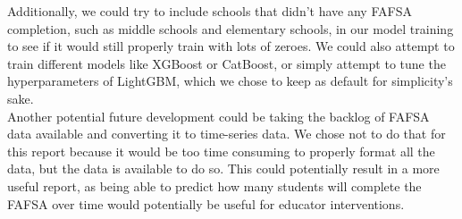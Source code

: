 \documentclass[12pt]{article}
\begin{document}
Additionally, we could try to include schools that didn't have any FAFSA completion, 
such as middle schools and elementary schools, in our model training to see if it would
still properly train with lots of zeroes. We could also attempt to train different models
like XGBoost or CatBoost, or simply attempt to tune the hyperparameters of LightGBM,
which we chose to keep as default for simplicity's sake.\\

Another potential future development could be taking the backlog of FAFSA data
available and converting it to time-series data. We chose not to do that for this
report because it would be too time consuming to properly format all the data, but
the data is available to do so.\cite{fafsa2019} This could potentially result in a
more useful report, as being able to predict how many students will complete the FAFSA
over time would potentially be useful for educator interventions.

\printbibliography
%   


\end{document}
